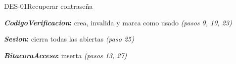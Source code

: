 \begin{fichacu}{DES-01}{Recuperar contraseña}
{\begin{cudatos}
      \item \textbf{\textit{CodigoVerificacion}:} crea, invalida y marca como usado \textit{(pasos 9, 10, 23)}
      \item \textbf{\textit{Sesion}:} cierra todas las abiertas \textit{(paso 25)}
      \item \textbf{\textit{BitacoraAcceso}:} inserta \textit{(pasos 13, 27)}
    \end{cudatos}} \\ \hline
\end{fichacu}
\clearpage
